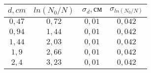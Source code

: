 \begin{tabular}{| c | c | c | c |}
\hline
$d, cm$ & $ln(N_0/N)$ & $\sigma_{d}, см$ & $\sigma_{ln(N_0/N)}$\\
\hline
$0,47$ & $0,72$ & $0,01$ & $0,042$\\
\hline
$0,94$ & $1,44$ & $0,01$ & $0,042$\\
\hline
$1,44$ & $2,03$ & $0,01$ & $0,042$\\
\hline
$1,9$ & $2,66$ & $0,01$ & $0,042$\\
\hline
$2,4$ & $3,23$ & $0,01$ & $0,042$\\
\hline
\end{tabular}
